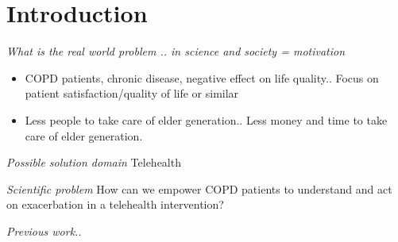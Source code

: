 \section{Introduction}

\textit{What is the real world problem .. in science and society = motivation}
\begin{itemize}
\item COPD patients, chronic disease, negative effect on life quality.. Focus on patient satisfaction/quality of life or similar 
\item Less people to take care of elder generation.. Less money and time to take care of elder generation. 
\end{itemize}

\textit{Possible solution domain}
Telehealth

\textit{Scientific problem}
How can we empower COPD patients to understand and act on exacerbation in a telehealth intervention? 

\textit{Previous work..}
